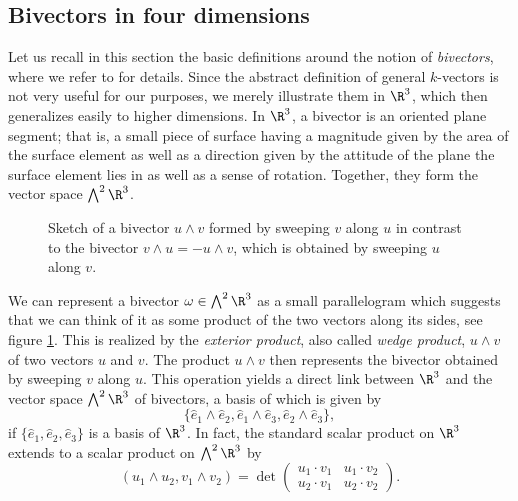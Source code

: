 \subsection{Bivectors in four dimensions}
\label{sec:bivectors}
Let us recall in this section the basic definitions around the notion of \emph{bivectors}, where we refer to \cite{Lounesto2006} for details. Since the abstract definition of general $k$-vectors is not very useful for our purposes, we merely illustrate them in $\R^3$, which then generalizes easily to higher dimensions. In $\R^3$, a bivector is an oriented plane segment; that is, a small piece of surface having a magnitude given by the area of the surface element as well as a direction given by the attitude of the plane the surface element lies in as well as a sense of rotation. Together, they form the vector space $\bigwedge^2 \R^3$.
\begin{figure}[h]
    \centering
    \caption{Sketch of a bivector $u \wedge v$ formed by sweeping $v$ along $u$ in contrast to the bivector $v \wedge u = - u \wedge v$, which is obtained by sweeping $u$ along $v$.}
    \label{fig:bivectors}
\end{figure}
We can represent a bivector $\omega \in \bigwedge^2 \R^3$ as a small parallelogram which suggests that we can think of it as some product of the two vectors along its sides, see figure \ref{fig:bivectors}. This is realized by the \emph{exterior product}, also called \emph{wedge product}, $u \wedge v$ of two vectors $u$ and $v$. The product $u \wedge v$ then represents the bivector obtained by sweeping $v$ along $u$. This operation yields a direct link between $\R^3$ and the vector space $\bigwedge^2 \R^3$ of bivectors, a basis of which is given by
\begin{equation}
 \{\hat{e}_1 \wedge \hat{e}_2, \hat{e}_1 \wedge \hat{e}_3, \hat{e}_2 \wedge \hat{e}_3\},
\end{equation}
if $\{\hat{e}_1, \hat{e}_2, \hat{e}_3\}$ is a basis of $\R^3$. In fact, the standard scalar product on $\R^3$ extends to a scalar product on $\bigwedge^2 \R^3$ by
\begin{equation}
( u_1 \wedge u_2 , v_1 \wedge v_2 ) = \det \left (\begin{array}{cc}
u_1 \cdot v_1 & u_1 \cdot v_2 \\ 
u_2 \cdot v_1 & u_2 \cdot v_2
\end{array}  \right).
\end{equation}
